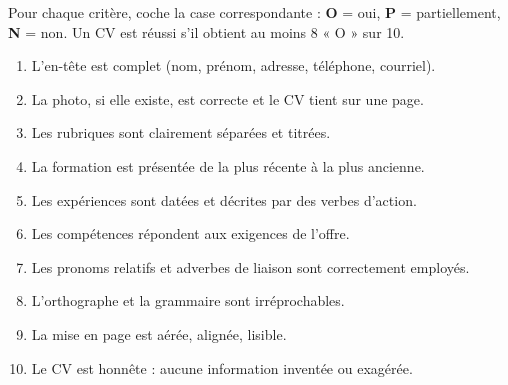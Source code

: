 \documentclass[11pt]{article}
\begin{document}
\begin{methode}
Pour chaque critère, coche la case correspondante : \textbf{O} = oui, \textbf{P} = partiellement, \textbf{N} = non. Un CV est réussi s'il obtient au moins 8 « O » sur 10.
\begin{enumerate}
\item L'en-tête est complet (nom, prénom, adresse, téléphone, courriel).
\item La photo, si elle existe, est correcte et le CV tient sur une page.
\item Les rubriques sont clairement séparées et titrées.
\item La formation est présentée de la plus récente à la plus ancienne.
\item Les expériences sont datées et décrites par des verbes d'action.
\item Les compétences répondent aux exigences de l'offre.
\item Les pronoms relatifs et adverbes de liaison sont correctement employés.
\item L'orthographe et la grammaire sont irréprochables.
\item La mise en page est aérée, alignée, lisible.
\item Le CV est honnête : aucune information inventée ou exagérée.
\end{enumerate}
\end{methode}
\end{document}
